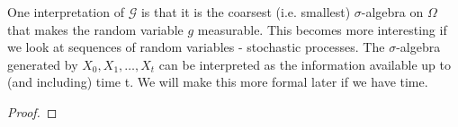 \documentclass[11pt]{scrartcl}
\begin{document}
\begin{remark}
One interpretation of $\mathscr{G}$ is that it is the coarsest (i.e. smallest) $\sigma$-algebra on $\Omega$ that makes the random variable $g$ measurable. This becomes more interesting if we look at sequences of random variables - stochastic processes. The $\sigma$-algebra generated by $X_0, X_1, \dots, X_t$ can be interpreted as the information available up to (and including) time t. We will make this more formal later if we have time.
\end{remark}





\begin{exercise}

\end{exercise}

\begin{theorem}

\end{theorem}

\begin{lemma}

\end{lemma}
\begin{proof}

\end{proof}

\begin{definition}

\end{definition}




\end{document}
